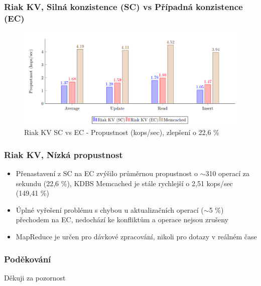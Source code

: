 \documentclass{beamer}
\begin{document}
	\begin{frame}
		\frametitle{Riak KV, Silná konzistence (SC) vs Případná konzistence (EC)}
		\begin{figure}
			\centering
			\includegraphics[scale=0.44]{Figures/riak_sc_ec.PNG}
			\caption{Riak KV SC vs EC - Propustnost (kops/sec), zlepšení o 22,6 \%}
		\end{figure}
	\end{frame}
	
	\begin{frame}
		\frametitle{Riak KV, Nízká propustnost}
		\begin{itemize}
			\item Přenastavení z SC na EC zvýšilo průměrnou propustnost o $\sim$310 operací za sekundu (22,6 \%), KDBS Memcached je stále rychlejší o 2,51 kops/sec (149,41 \%)
			\item Úplné vyřešení problému s chybou u aktualizačních operací ($\sim$5 \%) přechodem na EC, nedochází ke konfliktům a operace nejsou zrušeny
			\item MapReduce je určen pro dávkové zpracování, nikoli pro dotazy v reálném čase
		\end{itemize}
	\end{frame}
	
	\begin{frame}[noframenumbering]
		\frametitle{Poděkování}
		\begin{center}
			\Huge
			Děkuji za pozornost
		\end{center}
	\end{frame}
\end{document}
